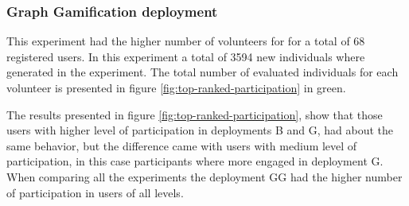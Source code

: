 \documentclass[conference]{IEEEtran}
\begin{document}
\subsubsection{ Graph Gamification deployment}
This experiment had the higher number of volunteers for for a total of 68 registered users. 
In this experiment a total of 3594 new individuals where generated in the experiment. 
The total number of evaluated individuals for each volunteer is presented in figure 
\ref{fig:top-ranked-participation} in green. 

The results presented in figure \ref{fig:top-ranked-participation}, show that those users with
higher level of participation in deployments B and G, had about the same behavior, but the difference
came with users with medium level of participation, in this case participants where more engaged in deployment
G. When comparing all the experiments the deployment GG had the higher number of participation in users
of all levels.    
\end{document}
